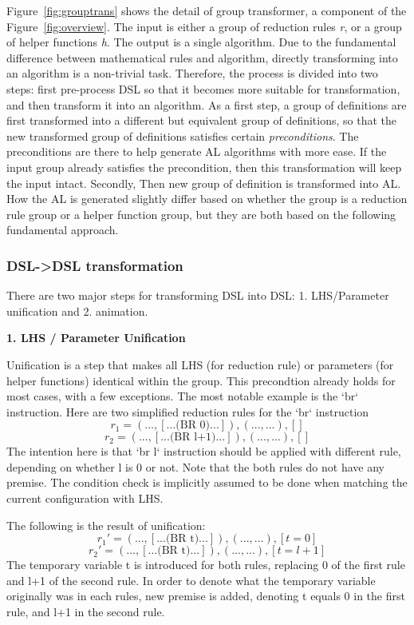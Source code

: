 Figure~\ref{fig:grouptrans} shows the detail of group transformer, a component of the Figure~\ref{fig:overview}.
The input is either a group of reduction rules \textit{r}, or a group of helper functions \textit{h}.
The output is a single algorithm.
Due to the fundamental difference between mathematical rules and algorithm,
directly transforming into an algorithm is a non-trivial task.
Therefore, the process is divided into two steps: first pre-process DSL so that
it becomes more suitable for transformation, and then transform it into an algorithm.
As a first step, a group of definitions are first transformed into a different but equivalent group of definitions,
so that the new transformed group of definitions satisfies certain \textit{preconditions}.
The preconditions are there to help generate AL algorithms with more ease.
If the input group already satisfies the precondition, then this transformation will keep the input intact.
Secondly, Then new group of definition is transformed into AL.
How the AL is generated slightly differ based on whether the group is a reduction rule group or a helper function
group, but they are both based on the following fundamental approach.

\subsubsection{DSL->DSL transformation}

There are two major steps for transforming DSL into DSL: 1. LHS/Parameter unification and
2. animation.

\textbf{1. LHS / Parameter Unification}

Unification is a step that makes all LHS (for reduction rule) or parameters
(for helper functions) identical within the group.
This precondtion already holds for most cases, with a few exceptions.
The most notable example is the `br` instruction.
Here are two simplified reduction rules for the `br` instruction
\[
r_1 = (..., [... \text{(BR 0)} ...]),  (..., ...), []
\]
\[
r_2 = (..., [... \text{(BR l+1)} ...]),  (..., ...), []
\]
The intention here is that `br l` instruction should be applied with different rule,
depending on whether l is 0 or not.
Note that the both rules do not have any premise. The condition check is implicitly assumed to be
done when matching the current configuration with LHS.

The following is the result of unification:
\[
r_1' = (..., [... \text{(BR t)} ...]),  (..., ...), [t = 0]
\]
\[
r_2' = (..., [... \text{(BR t)} ...]),  (..., ...), [t = l + 1]
\]
The temporary variable t is introduced for both rules, replacing 0 of the first rule and
l+1 of the second rule. In order to denote what the temporary variable originally was
in each rules, new premise is added, denoting t equals 0 in the first rule, and l+1 in the second rule.

